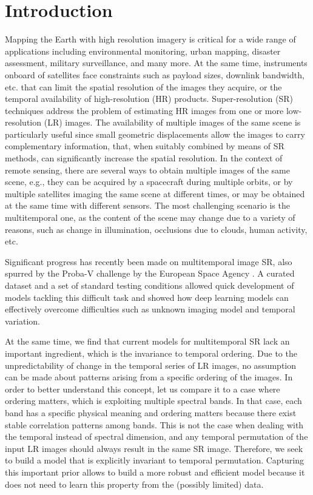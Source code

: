 \documentclass[journal]{IEEEtran}
\begin{document}
\IEEEpeerreviewmaketitle



\section{Introduction}
\label{sec:intro}

Mapping the Earth with high resolution imagery is critical for a wide range of applications including environmental monitoring, urban mapping, disaster assessment, military surveillance, and many more. At the same time, instruments onboard of satellites face constraints such as payload sizes, downlink bandwidth, etc. that can limit the spatial resolution of the images they acquire, or the temporal availability of high-resolution (HR) products. Super-resolution (SR) techniques address the problem of estimating HR images from one or more low-resolution (LR) images. The availability of multiple images of the same scene is particularly useful since small geometric displacements allow the images to carry complementary information, that, when suitably combined by means of SR methods, can significantly increase the spatial resolution. In the context of remote sensing, there are several ways to obtain multiple images of the same scene, e.g., they can be acquired by a  spacecraft  during  multiple  orbits, or by multiple satellites imaging the same scene at different times, or may be obtained at the same time with different sensors. The most challenging scenario is the multitemporal one, as the content of the scene may change due to a variety of reasons, such as change in illumination, occlusions due to clouds, human activity, etc.

Significant progress has recently been made on multitemporal image SR, also spurred by the Proba-V challenge by the European Space Agency \cite{martens2019super, web:kelvins}. A curated dataset and a set of standard testing conditions allowed quick development of models tackling this difficult task and showed how deep learning models can effectively overcome difficulties such as unknown imaging model and temporal variation.

At the same time, we find that current models for multitemporal SR lack an important ingredient, which is the invariance to temporal ordering. Due to the unpredictability of change in the temporal series of LR images, no assumption can be made about patterns arising from a specific ordering of the images. In order to better understand this concept, let us compare it to a case where ordering matters, which is exploiting multiple spectral bands. In that case, each band has a specific physical meaning and ordering matters because there exist stable correlation patterns among bands. This is not the case when dealing with the temporal instead of spectral dimension, and any temporal permutation of the input LR images should always result in the same SR image. Therefore, we seek to build a model that is explicitly invariant to temporal permutation. Capturing this important prior allows to build a more robust and efficient model because it does not need to learn this property from the (possibly limited) data.
\end{document}
